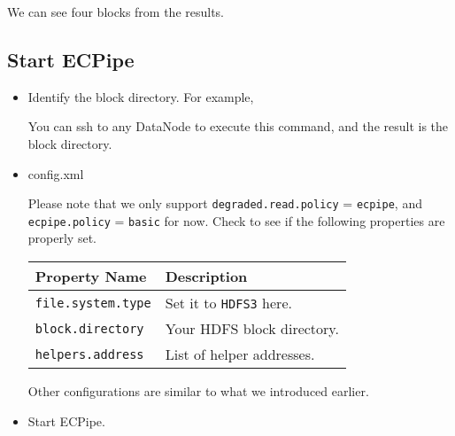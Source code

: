 \documentclass[letterpaper,12pt]{article}
\begin{document}
\begin{itemize}
\begin{itemize}
\noindent{}

We can see four blocks from the results.

\end{itemize}

\subsection{Start ECPipe}

\begin{itemize}

\item Identify the block directory.  For example,

\noindent{}

You can ssh to any DataNode to execute this command, and the result is the
block directory.

\item config.xml

Please note that we only support {\tt degraded.read.policy} = {\tt ecpipe},
and {\tt ecpipe.policy} = {\tt basic} for now.  Check
 to see if the following properties are properly
set.

\begin{tabular}{|l|l|}
\hline
{\bf Property Name} & {\bf Description }\\
\hline
{\tt file.system.type} & Set it to {\tt HDFS3} here. \\
\hline
{\tt block.directory} & Your HDFS block directory. \\
\hline
{\tt helpers.address} &  List of helper addresses. \\
\hline
\end{tabular}

Other configurations are similar to what we introduced earlier.

\item Start ECPipe.

\begin{center}
\noindent{}
\end{center}

\end{itemize}


\end{itemize}
\end{document}
